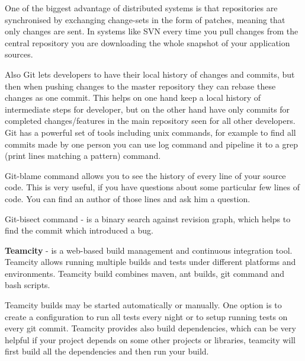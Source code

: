 \documentclass{article}
\begin{document}
  One of the biggest advantage of distributed systems is that repositories are
  synchronised by exchanging change-sets in the form of patches, meaning that 
  only changes are sent. In systems like SVN every time you pull changes from
  the central repository you are downloading the whole snapshot of your application sources.
  
  Also Git lets developers to have their local history of changes and commits,
  but then when pushing changes to the master repository they can rebase these changes as one commit.
  This helps on one hand keep a local history of intermediate steps for
  developer, but on the other hand have only commits for completed changes/features in the main repository
  seen for all other developers. Git has a powerful set of tools including unix commands,
  for example to find all commits made by one person you can use log command and pipeline it to a grep 
  (print lines matching a pattern) command.
  
   Git-blame command allows you to see the history of every line of your source
   code. This is very useful, if you have questions about some particular few lines of code.
   You can find an author of those lines and ask him a question.
   
   Git-bisect command - is a binary search against revision graph, which helps to find the commit which
   introduced a bug.

  \textbf{Teamcity} - is a web-based build management and continuous integration
  tool. Teamcity allows running multiple builds and tests under different platforms and environments.
  Teamcity build combines maven, ant builds, git command and bash scripts.
  
  Teamcity builds may be started automatically or manually. One option is to create a configuration to run all
  tests every night or to setup running tests on every git commit. Teamcity
  provides also build dependencies, which can be very helpful if your project
  depends on some other projects or libraries, teamcity will first build all the dependencies and then run your build.
  
\end{document}
